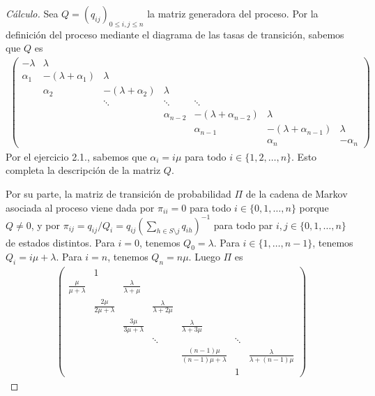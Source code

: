 \documentclass{article}
\theoremstyle{definition}
\begin{document}
\begin{proof}[Cálculo]
Sea \(Q = (q_{i j})_{0 \leq i, j \leq n}\) la matriz generadora del proceso.
Por la definición del proceso mediante el diagrama de las tasas de transición, sabemos que \(Q\) es
\begin{align}
	\begin{pmatrix}
		- \lambda & \lambda \\
		\alpha_1 & -(\lambda + \alpha_1) & \lambda \\
		 & \alpha_2 & -(\lambda + \alpha_2) & \lambda \\
		 & & \ddots & \ddots & \ddots \\
		 & & & \alpha_{n - 2} & -(\lambda + \alpha_{n - 2}) & \lambda \\
		 & & & &\alpha_{n - 1} & -(\lambda + \alpha_{n - 1}) & \lambda \\
		 & & & & &\alpha_n & - \alpha_n
	\end{pmatrix}
\end{align}
Por el ejercicio 2.1., sabemos que \(\alpha_i = i \mu\) para todo \(i \in \{1, 2, \dots, n\}\).
Esto completa la descripción de la matriz \(Q\).


Por su parte, la matriz de transición de probabilidad \(\Pi\) de la cadena de Markov asociada al proceso viene dada por \(\pi_{i i} = 0\) para todo \(i \in \{0, 1, \dots, n\}\) porque \(Q \neq 0\), y por \(\pi_{i j} = q_{i j} / Q_i = q_{i j} \left( \sum_{h \in S \setminus j} q_{i h} \right)^{- 1}\) para todo par \(i, j \in \{0, 1, \dots, n\}\) de estados distintos.
Para \(i = 0\), tenemos \(Q_0 = \lambda\).
Para \(i \in \{1, \dots, n - 1\}\), tenemos \(Q_i = i \mu + \lambda\).
Para \(i = n\), tenemos \(Q_n = n \mu\).
Luego \(\Pi\) es
\begin{align}
	\begin{pmatrix}
		 & 1  \\
		\frac{\mu}{\mu + \lambda} & & \frac{\lambda}{ \lambda + \mu} \\ 
		 & \frac{2 \mu}{2 \mu + \lambda} & & \frac{\lambda}{\lambda + 2 \mu} \\
		 & & \frac{3 \mu}{3 \mu + \lambda} & & \frac{\lambda}{\lambda + 3 \mu} \\
		 & & & \ddots & & \ddots \\
		 & & & & \frac{(n - 1) \mu}{(n - 1) \mu + \lambda} & & \frac{\lambda}{\lambda + (n - 1) \mu} \\
		 & & & & & 1
	\end{pmatrix}
\end{align}

\end{proof}
\end{document}
